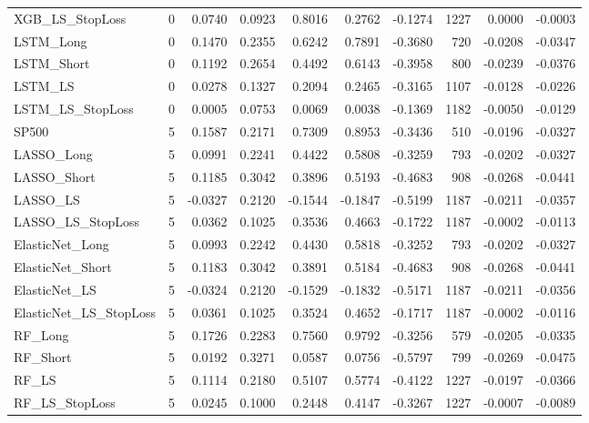 \begin{tabular}{llrrrrrrrr}
\cline{1-10}
XGB\_LS\_StopLoss & 0 & 0.0740 & 0.0923 & 0.8016 & 0.2762 & -0.1274 & 1227 & 0.0000 & -0.0003 \\
\cline{1-10}
LSTM\_Long & 0 & 0.1470 & 0.2355 & 0.6242 & 0.7891 & -0.3680 & 720 & -0.0208 & -0.0347 \\
\cline{1-10}
LSTM\_Short & 0 & 0.1192 & 0.2654 & 0.4492 & 0.6143 & -0.3958 & 800 & -0.0239 & -0.0376 \\
\cline{1-10}
LSTM\_LS & 0 & 0.0278 & 0.1327 & 0.2094 & 0.2465 & -0.3165 & 1107 & -0.0128 & -0.0226 \\
\cline{1-10}
LSTM\_LS\_StopLoss & 0 & 0.0005 & 0.0753 & 0.0069 & 0.0038 & -0.1369 & 1182 & -0.0050 & -0.0129 \\
\cline{1-10}
SP500 & 5 & 0.1587 & 0.2171 & 0.7309 & 0.8953 & -0.3436 & 510 & -0.0196 & -0.0327 \\
\cline{1-10}
LASSO\_Long & 5 & 0.0991 & 0.2241 & 0.4422 & 0.5808 & -0.3259 & 793 & -0.0202 & -0.0327 \\
\cline{1-10}
LASSO\_Short & 5 & 0.1185 & 0.3042 & 0.3896 & 0.5193 & -0.4683 & 908 & -0.0268 & -0.0441 \\
\cline{1-10}
LASSO\_LS & 5 & -0.0327 & 0.2120 & -0.1544 & -0.1847 & -0.5199 & 1187 & -0.0211 & -0.0357 \\
\cline{1-10}
LASSO\_LS\_StopLoss & 5 & 0.0362 & 0.1025 & 0.3536 & 0.4663 & -0.1722 & 1187 & -0.0002 & -0.0113 \\
\cline{1-10}
ElasticNet\_Long & 5 & 0.0993 & 0.2242 & 0.4430 & 0.5818 & -0.3252 & 793 & -0.0202 & -0.0327 \\
\cline{1-10}
ElasticNet\_Short & 5 & 0.1183 & 0.3042 & 0.3891 & 0.5184 & -0.4683 & 908 & -0.0268 & -0.0441 \\
\cline{1-10}
ElasticNet\_LS & 5 & -0.0324 & 0.2120 & -0.1529 & -0.1832 & -0.5171 & 1187 & -0.0211 & -0.0356 \\
\cline{1-10}
ElasticNet\_LS\_StopLoss & 5 & 0.0361 & 0.1025 & 0.3524 & 0.4652 & -0.1717 & 1187 & -0.0002 & -0.0116 \\
\cline{1-10}
RF\_Long & 5 & 0.1726 & 0.2283 & 0.7560 & 0.9792 & -0.3256 & 579 & -0.0205 & -0.0335 \\
\cline{1-10}
RF\_Short & 5 & 0.0192 & 0.3271 & 0.0587 & 0.0756 & -0.5797 & 799 & -0.0269 & -0.0475 \\
\cline{1-10}
RF\_LS & 5 & 0.1114 & 0.2180 & 0.5107 & 0.5774 & -0.4122 & 1227 & -0.0197 & -0.0366 \\
\cline{1-10}
RF\_LS\_StopLoss & 5 & 0.0245 & 0.1000 & 0.2448 & 0.4147 & -0.3267 & 1227 & -0.0007 & -0.0089 \\

\end{tabular}
